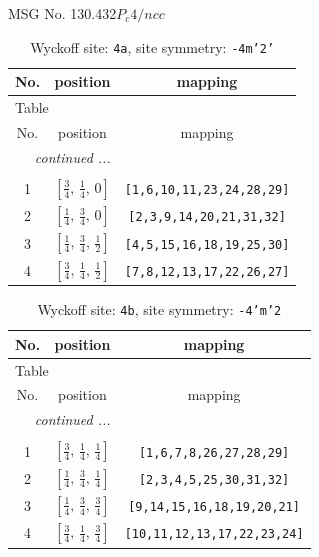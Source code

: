 \documentclass[fleqn,8pt]{jsarticle}
\begin{document}
\setcounter{MaxMatrixCols}{32}

\renewcommand{\tablename}{Table~}
\renewcommand{\figurename}{Figure~}
\begin{center}
\LARGE
MSG No. 130.432\quad$P_{c}4/ncc$
\end{center}
\renewcommand{\arraystretch}{1.2}
\begin{longtable}{ccc}
\caption{Wyckoff site: {\tt 4a}, site symmetry: {\tt -4m'2'}}
 \\
 \hline \hline
No. & position & mapping \\ \hline \endfirsthead

\multicolumn{2}{l}{\tablename\ \thetable{}} \\
 \hline \hline
No. & position & mapping \\ \hline \endhead

 \hline \hline
\multicolumn{2}{r}{\footnotesize\it continued ...} \\ \endfoot

 \hline \hline
\multicolumn{2}{r}{} \\ \endlastfoot

1 & $\left[ \frac{3}{4},\, \frac{1}{4},\, 0 \right]$ & {\tt [1,6,10,11,23,24,28,29]} \\ \hline
2 & $\left[ \frac{1}{4},\, \frac{3}{4},\, 0 \right]$ & {\tt [2,3,9,14,20,21,31,32]} \\ \hline
3 & $\left[ \frac{1}{4},\, \frac{3}{4},\, \frac{1}{2} \right]$ & {\tt [4,5,15,16,18,19,25,30]} \\ \hline
4 & $\left[ \frac{3}{4},\, \frac{1}{4},\, \frac{1}{2} \right]$ & {\tt [7,8,12,13,17,22,26,27]} \\
\end{longtable}
\renewcommand{\arraystretch}{1.2}
\begin{longtable}{ccc}
\caption{Wyckoff site: {\tt 4b}, site symmetry: {\tt -4'm'2}}
 \\
 \hline \hline
No. & position & mapping \\ \hline \endfirsthead

\multicolumn{2}{l}{\tablename\ \thetable{}} \\
 \hline \hline
No. & position & mapping \\ \hline \endhead

 \hline \hline
\multicolumn{2}{r}{\footnotesize\it continued ...} \\ \endfoot

 \hline \hline
\multicolumn{2}{r}{} \\ \endlastfoot

1 & $\left[ \frac{3}{4},\, \frac{1}{4},\, \frac{1}{4} \right]$ & {\tt [1,6,7,8,26,27,28,29]} \\ \hline
2 & $\left[ \frac{1}{4},\, \frac{3}{4},\, \frac{1}{4} \right]$ & {\tt [2,3,4,5,25,30,31,32]} \\ \hline
3 & $\left[ \frac{1}{4},\, \frac{3}{4},\, \frac{3}{4} \right]$ & {\tt [9,14,15,16,18,19,20,21]} \\ \hline
4 & $\left[ \frac{3}{4},\, \frac{1}{4},\, \frac{3}{4} \right]$ & {\tt [10,11,12,13,17,22,23,24]} \\
\end{longtable}
\end{document}
